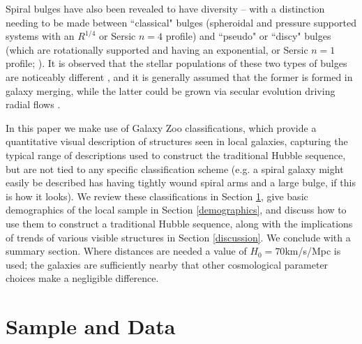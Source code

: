 \documentclass[usenatbib]{mn2e}
\begin{document}
Spiral bulges have also been revealed to have diversity -- with a distinction needing to be made between ``classical" bulges (spheroidal and pressure supported systems with an $R^{1/4}$ or Sersic $n=4$ profile) and ``pseudo" or ``discy" bulges (which are rotationally supported and having an exponential, or Sersic $n=1$ profile; \citealt{gadotti2009,kormendykennicutt2004}). It is observed that the stellar populations of these two types of bulges are noticeably different \citep{FisherDrory}, and it is generally assumed that the former is formed in galaxy merging, while the latter could be grown via secular evolution driving radial flows \citep[e.g.][]{gadotti2009}. 

In this paper we make use of Galaxy Zoo classifications, which provide a quantitative visual description of structures seen in local galaxies, capturing the typical range of descriptions used to construct the traditional Hubble sequence, but are not tied to any specific classification scheme (e.g. a spiral galaxy might easily be described has having tightly wound spiral arms and a large bulge, if this is how it looks). We review these classifications in Section \ref{sample}, give basic demographics of the local sample in Section \ref{demographics}, and discuss how to use them to construct a traditional Hubble sequence, along with the implications of trends of various visible structures in Section \ref{discussion}. We conclude with a summary section. Where distances are needed a value of $H_0 = 70$km/s/Mpc is used; the galaxies are sufficiently nearby that other cosmological parameter choices make a negligible difference. 



\section{Sample and Data} \label{sample}
\end{document}
